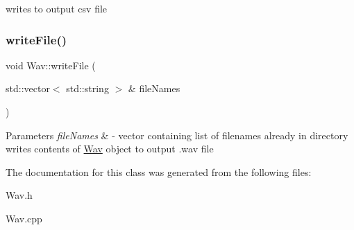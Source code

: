 writes to output csv file \mbox{\label{classWav_a6569b629ca9e46d0093f8bfd23d92735}} 
\subsubsection{\texorpdfstring{write\+File()}{writeFile()}}
{\footnotesize\ttfamily void Wav\+::write\+File (\begin{DoxyParamCaption}\item[{std\+::vector$<$ std\+::string $>$ \&}]{file\+Names }\end{DoxyParamCaption})}


\begin{DoxyParams}{Parameters}
{\em file\+Names} & -\/ vector containing list of filenames already in directory writes contents of \hyperlink{classWav}{Wav} object to output .wav file \\
\hline
\end{DoxyParams}


The documentation for this class was generated from the following files\+:\begin{DoxyCompactItemize}
\item 
Wav.\+h\item 
Wav.\+cpp\end{DoxyCompactItemize}
